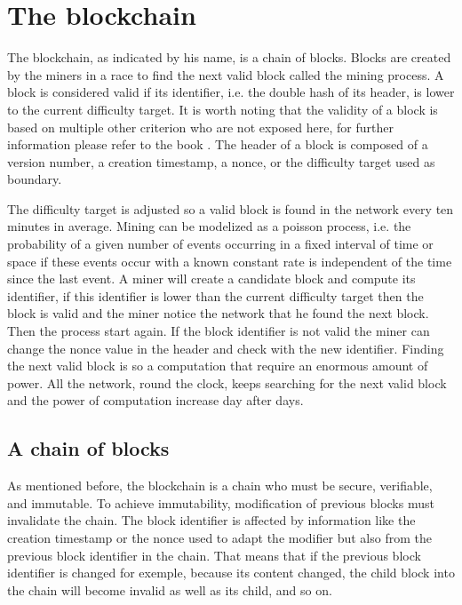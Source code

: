 \section{The blockchain}

The blockchain, as indicated by his name, is a chain of blocks. Blocks are created
by the miners in a race to find the next valid block called the mining process. A block is considered valid
if its identifier, i.e. the double hash of its header, is lower to the current
difficulty target. It is worth noting that the validity of a block is based on multiple
other criterion who are not exposed here, for further information please refer
to the book . The header of a block is composed of a version
number, a creation timestamp, a nonce, or the difficulty target used as boundary.

The difficulty target is adjusted so a valid block is found in the network every
ten minutes in average. Mining can be modelized as a poisson process, i.e. the probability
of a given number of events occurring in a fixed interval of time or space if these
events occur with a known constant rate is independent of the time since the last event.
A miner will create a candidate block and compute its identifier, if this identifier
is lower than the current difficulty target then the block is valid and the miner notice
the network that he found the next block. Then the process start again. If the block
identifier is not valid the miner can change the nonce value in the header and
check with the new identifier. Finding the next valid block is so a computation that
require an enormous amount of power. All the network, round the clock, keeps searching
for the next valid block and the power of computation increase day after days.

\subsection{A chain of blocks}

As mentioned before, the blockchain is a chain who must be secure, verifiable,
and immutable. To achieve immutability, modification of previous blocks must
invalidate the chain. The block identifier is affected by information like the
creation timestamp or the nonce used to adapt the modifier but also from the
previous block identifier in the chain. That means that if the previous block
identifier is changed for exemple, because its content changed, the child block
into the chain will become invalid as well as its child, and so on.

